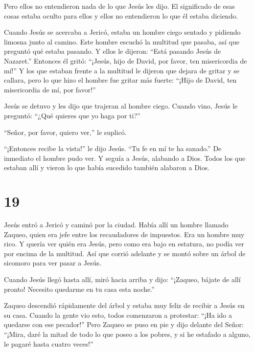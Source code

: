  Pero ellos no entendieron nada de lo que Jesús les dijo.
El significado de esas cosas estaba oculto para ellos y ellos no
entendieron lo que él estaba diciendo.

 Cuando Jesús se acercaba a Jericó, estaba un hombre ciego
sentado y pidiendo limosna junto al camino.  Este hombre
escuchó la multitud que pasaba, así que preguntó qué estaba pasando.
 Y ellos le dijeron: ``Está pasando Jesús de Nazaret.''
 Entonces él gritó: ``¡Jesús, hijo de David, por favor, ten
misericordia de mí!''  Y los que estaban frente a la
multitud le dijeron que dejara de gritar y se callara, pero lo que hizo
el hombre fue gritar más fuerte: ``¡Hijo de David, ten misericordia de
mí, por favor!''

 Jesús se detuvo y les dijo que trajeran al hombre ciego.
Cuando vino, Jesús le preguntó:  ``¿Qué quieres que yo haga
por ti?''

``Señor, por favor, quiero ver,'' le suplicó.

 ``¡Entonces recibe la vista!'' le dijo Jesús. ``Tu fe en
mí te ha sanado.''  De inmediato el hombre pudo ver. Y
seguía a Jesús, alabando a Dios. Todos los que estaban allí y vieron lo
que había sucedido también alabaron a Dios.

\hypertarget{section-18}{%
\section{19}\label{section-18}}

 Jesús entró a Jericó y caminó por la ciudad. 
Había allí un hombre llamado Zaqueo, quien era jefe entre los
recaudadores de impuestos. Era un hombre muy rico.  Y quería
ver quién era Jesús, pero como era bajo en estatura, no podía ver por
encima de la multitud.  Así que corrió adelante y se montó
sobre un árbol de sicomoro para ver pasar a Jesús.

 Cuando Jesús llegó hasta allí, miró hacia arriba y dijo:
``¡Zaqueo, bájate de allí pronto! Necesito quedarme en tu casa esta
noche.''

 Zaqueo descendió rápidamente del árbol y estaba muy feliz
de recibir a Jesús en su casa.  Cuando la gente vio esto,
todos comenzaron a protestar: ``¡Ha ido a quedarse con ese pecador!''
 Pero Zaqueo se puso en pie y dijo delante del Señor:
``¡Mira, daré la mitad de todo lo que poseo a los pobres, y si he
estafado a alguno, le pagaré hasta cuatro veces!''

